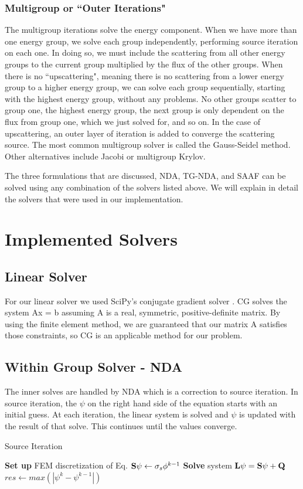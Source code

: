 \subsubsection{Multigroup or ``Outer Iterations"}
The multigroup iterations solve the energy component. When we have more than one energy group, we solve each group independently, performing source iteration on each one. In doing so, we must include the scattering from all other energy groups to the current group multiplied by the flux of the other groups. When there is no ``upscattering", meaning there is no scattering from a lower energy group to a higher energy group, we can solve each group sequentially, starting with the highest energy group, without any problems. No other groups scatter to group one, the highest energy group, the next group is only dependent on the flux from group one, which we just solved for, and so on. In the case of upscattering, an outer layer of iteration is added to converge the scattering source. The most common multigroup solver is called the Gauss-Seidel method. Other alternatives include Jacobi or multigroup Krylov. 

The three formulations that are discussed, NDA, TG-NDA, and SAAF can be solved using any combination of the solvers listed above. We will explain in detail the solvers that were used in our implementation. 

\section{Implemented Solvers}
\subsection{Linear Solver}
For our linear solver we used SciPy's conjugate gradient solver \cite{SciPy, Shewchuck1994}. CG solves the system Ax = b assuming A is a real, symmetric, positive-definite matrix. By using the finite element method, we are guaranteed that our matrix A satisfies those constraints, so CG is an applicable method for our problem.

\subsection{Within Group Solver - NDA}
The inner solves are handled by NDA which is a correction to source iteration. In source iteration, the $\psi$ on the right hand side of the equation starts with an initial guess. At each iteration, the linear system is solved and $\psi$ is updated with the result of that solve. This continues until the values converge. 
\begin{algorithm}
\caption{Source Iteration}
\begin{algorithmic}
 
    \State \textbf{Set up} FEM discretization of Eq.
    \State ${\bf S} \psi \gets \sigma_s \phi^{k-1}$ 
    \State \textbf{Solve} system $\textbf{L}\psi= {\bf S}\psi + {\bf Q}$
    \State $res \gets max(|\psi^{k} - \psi^{k-1}|)$
\EndWhile
\end{algorithmic}
\end{algorithm}

